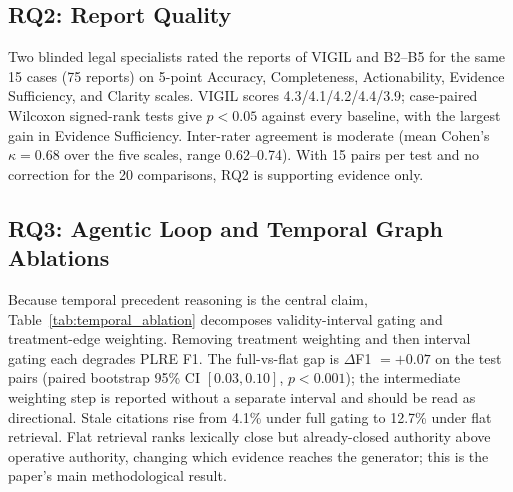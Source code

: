 \subsection{RQ2: Report Quality}

Two blinded legal specialists rated the reports of VIGIL and B2--B5 for the same 15 cases (75 reports) on 5-point Accuracy, Completeness, Actionability, Evidence Sufficiency, and Clarity scales. VIGIL scores 4.3/4.1/4.2/4.4/3.9; case-paired Wilcoxon signed-rank tests give $p<0.05$ against every baseline, with the largest gain in Evidence Sufficiency. Inter-rater agreement is moderate (mean Cohen's $\kappa=0.68$ over the five scales, range 0.62--0.74). With 15 pairs per test and no correction for the 20 comparisons, RQ2 is supporting evidence only.

\subsection{RQ3: Agentic Loop and Temporal Graph Ablations}

Because temporal precedent reasoning is the central claim, Table~\ref{tab:temporal_ablation} decomposes validity-interval gating and treatment-edge weighting. Removing treatment weighting and then interval gating each degrades PLRE F1. The full-vs-flat gap is $\Delta$F1 ${=}{+}0.07$ on the test pairs (paired bootstrap 95\% CI $[0.03,0.10]$, $p{<}0.001$); the intermediate weighting step is reported without a separate interval and should be read as directional. Stale citations rise from 4.1\% under full gating to 12.7\% under flat retrieval. Flat retrieval ranks lexically close but already-closed authority above operative authority, changing which evidence reaches the generator; this is the paper's main methodological result.

\begin{table}[t]
\centering
\caption{Temporal precedent-graph ablation (main claim). Both mechanisms of Eq.~\eqref{eq:tpg_score} are removed in sequence; the bottom row recovers flat semantic similarity. Stale-cite measures citations to already-closed precedent ($t_q\!\ge\!e_v$).}
\label{tab:temporal_ablation}
\small
\setlength{\tabcolsep}{4pt}
\end{table}

